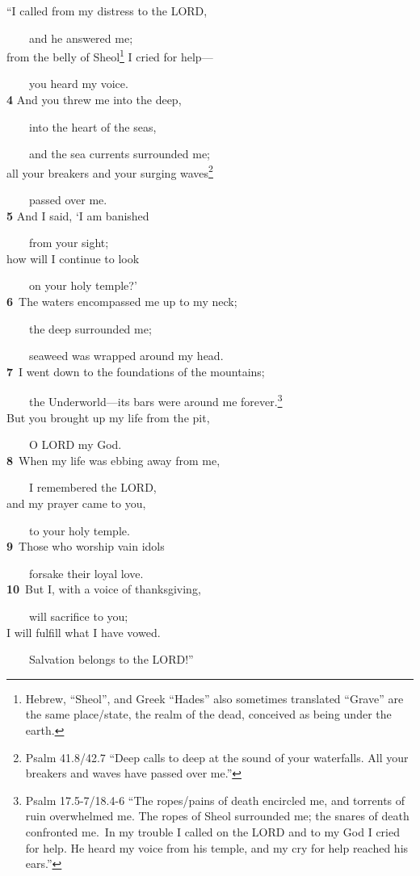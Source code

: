 \documentclass[
]{article}
\newcommand{\RL}[1]{\beginR #1\endR}
\begin{document}
\RL{``}I called from my distress to the LORD,\\
\strut ~~~~and he answered me;\\
from the belly of Sheol\footnote{Hebrew, ``Sheol'', and Greek ``Hades''
  also sometimes translated ``Grave'' are the same place/state, the
  realm of the dead, conceived as being under the earth.} I cried for
help---\\
\strut ~~~~you heard my voice.\\
\textbf{4} And you threw me into the deep,\\
\strut ~~~~into the heart of the seas,\\
\strut ~~~~and the sea currents surrounded me;\\
all your breakers and your surging waves\footnote{Psalm 41.8/42.7 ``Deep
  calls to deep at the sound of your waterfalls. All your breakers and
  waves have passed over me.''}\\
\strut ~~~~passed over me.\\
\textbf{5} And I said, \RL{`}I am banished\\
\strut ~~~~from your sight;\\
how will I continue to look\\
\strut ~~~~on your holy temple?\RL{'}\\
\textbf{6}~The waters encompassed me up to my neck;\\
\strut ~~~~the deep surrounded me;\\
\strut ~~~~seaweed was wrapped around my head.\\
\textbf{7}~I went down to the foundations of the mountains;\\
\strut ~~~~the Underworld---its bars were around me
forever.\footnote{Psalm 17.5-7/18.4-6 ``The ropes/pains of death
  encircled me, and torrents of ruin overwhelmed me. The ropes of Sheol
  surrounded me; the snares of death confronted me.~In my trouble I
  called on the LORD and to my God I cried for help. He heard my voice
  from his temple, and my cry for help reached his ears.''}\\
But you brought up my life from the pit,\\
\strut ~~~~O LORD my God.\\
\textbf{8}~When my life was ebbing away from me,\\
\strut ~~~~I remembered the LORD,\\
and my prayer came to you,\\
\strut ~~~~to your holy temple.\\
\textbf{9}~Those who worship vain idols\\
\strut ~~~~forsake their loyal love.\\
\textbf{10}~But I, with a voice of thanksgiving,\\
\strut ~~~~will sacrifice to you;\\
I will fulfill what I have vowed.\\
\strut ~~~~Salvation belongs to the LORD!''
\end{document}

